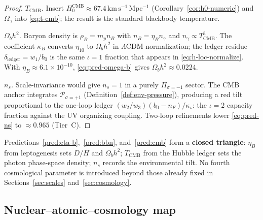 \begin{proof}
\emph{$T_{\mathrm{CMB}}$.}
Insert $H_0^{\mathrm{CMB}}\approx 67.4\,\mathrm{km\,s^{-1}\,Mpc^{-1}}$
(Corollary~\ref{cor:h0-numeric}) and $\Omega_\gamma$ into
\eqref{eq:t-cmb}; the result is the standard blackbody temperature.

\emph{$\Omega_b h^2$.}
Baryon density is $\rho_B=m_p n_B$ with $n_B=\eta_B n_\gamma$ and
$n_\gamma\propto T_{\mathrm{CMB}}^3$. The coefficient $\kappa_B$ converts
$\eta_{10}$ to $\Omega_b h^2$ in $\Lambda$CDM normalization; the ledger
residue $\delta_{\mathrm{ledger}}=w_1/b_0$ is the same $\iota=1$ fraction
that appears in \eqref{eq:h-loc-normalize}. With $\eta_B\approx 6.1\times
10^{-10}$, \eqref{eq:pred-omega-b} gives $\Omega_b h^2\approx 0.0224$.

\emph{$n_s$.}
Scale-invariance would give $n_s=1$ in a purely $\Pi_{\sigma=-1}$ sector.
The CMB anchor integrates $\mathcal{P}_{\sigma=+1}$ (Definition~\ref{def:env-pressure}),
producing a red tilt proportional to the one-loop ledger
$(w_2/w_3)(b_0-n_F)/\kappa_\star$: the $\iota=2$ capacity fraction against
the UV organizing coupling. Two-loop refinements lower \eqref{eq:pred-ns} to
$\approx 0.965$ (Tier~C).
\end{proof}

\begin{remark}
Predictions~\ref{pred:eta-b},~\ref{pred:bbn}, and~\ref{pred:cmb} form a
\textbf{closed triangle}: $\eta_B$ from leptogenesis sets $D/H$ and
$\Omega_b h^2$; $T_{\mathrm{CMB}}$ from the Hubble ledger sets the photon
phase-space density; $n_s$ records the environmental tilt. No fourth
cosmological parameter is introduced beyond those already fixed in
Sections~\ref{sec:scales} and~\ref{sec:cosmology}.
\end{remark}

\subsection{Nuclear--atomic--cosmology map}
\label{sec:nuclear:table}

